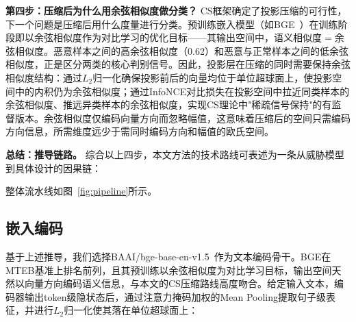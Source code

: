 \textbf{第四步：压缩后为什么用余弦相似度做分类？} CS框架确定了投影压缩的可行性，下一个问题是压缩后用什么度量进行分类。预训练嵌入模型（如BGE~\cite{xiao2023cpack}）在训练阶段即以余弦相似度作为对比学习的优化目标——其输出空间中，语义相似度$=$余弦相似度。恶意样本之间的高余弦相似度（0.62）和恶意与正常样本之间的低余弦相似度，正是区分两类的核心判别信号。因此，投影层在压缩的同时需要保持余弦相似度结构：通过$L_2$归一化确保投影前后的向量均位于单位超球面上，使投影空间中的内积仍为余弦相似度；通过InfoNCE对比损失在投影空间中拉近同类样本的余弦相似度、推远异类样本的余弦相似度，实现CS理论中"稀疏信号保持"的有监督版本。余弦相似度仅编码向量方向而忽略幅值，这意味着压缩后的空间只需编码方向信息，所需维度远少于需同时编码方向和幅值的欧氏空间。

\textbf{总结：推导链路。} 综合以上四步，本文方法的技术路线可表述为一条从威胁模型到具体设计的因果链：

\begin{center}
\end{center}

整体流水线如图~\ref{fig:pipeline}所示。



\subsection{嵌入编码}

基于上述推导，我们选择BAAI/bge-base-en-v1.5~\cite{xiao2023cpack}作为文本编码骨干。BGE在MTEB基准上排名前列，且其预训练以余弦相似度为对比学习目标，输出空间天然以向量方向编码语义信息，与本文的CS压缩路线高度吻合。给定输入文本，编码器输出token级隐状态后，通过注意力掩码加权的Mean Pooling提取句子级表征，并进行$L_2$归一化使其落在单位超球面上：

